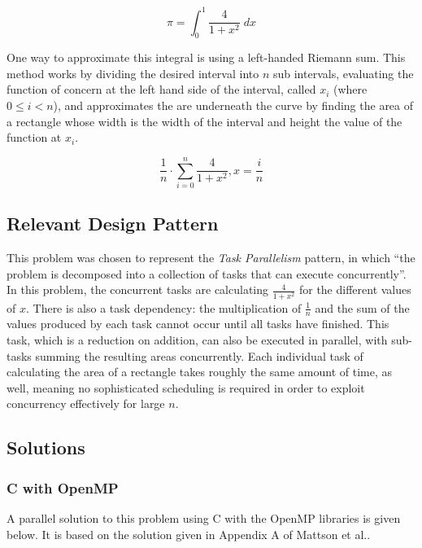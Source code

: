 \begin{equation} \label{eq::pi_int}
\pi = \int_0^1 \frac{4}{1 + x^2} \; dx
\end{equation}

\noindent One way to approximate this integral is using a left-handed Riemann sum. 
This method works by dividing the desired interval into $n$ sub intervals, 
evaluating the function of concern at the left hand side of the interval, called $x_i$ (where $0 \le i < n$), 
and approximates the are underneath the curve by finding the area of a rectangle 
whose width is the width of the interval and height the value of the function at $x_i$.

\[\frac{1}{n} \cdot \sum_{i=0}^n \frac{4}{1 + x^2}, x = \frac{i}{n} \]

\subsection{Relevant Design Pattern}
This problem was chosen to represent the \textit{Task Parallelism} pattern, 
in which ``the problem is decomposed into a collection of tasks that can execute concurrently''\cite{mass}.
In this problem, the concurrent tasks are calculating $\frac{4}{1 + x^2}$ for the different values of $x$. 
There is also a task dependency: the multiplication of $\frac{1}{n}$ and the sum of the values produced by each task 
cannot occur until all tasks have finished. 
This task, which is a reduction on addition, can also be executed in parallel, 
with sub-tasks summing the resulting areas concurrently.
Each individual task of calculating the area of a rectangle takes roughly the same amount of time, as well, 
meaning no sophisticated scheduling is required in order to exploit concurrency effectively for large $n$.

\subsection{Solutions}
\subsubsection{C with OpenMP}
A parallel solution to this problem using C with the OpenMP libraries is given below. 
It is based on the solution given in Appendix A of Mattson et al.\cite{mass}.

\begin{singlespacing}
\begin{small}

\end{small}
\end{singlespacing}

